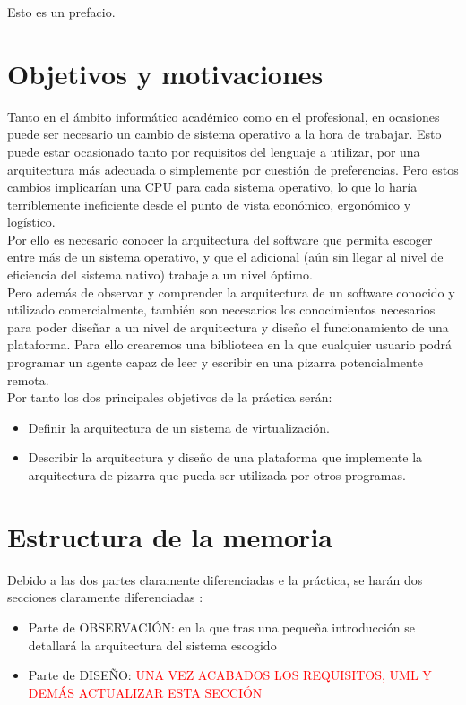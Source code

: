 \lettrine[lines=1,slope=4pt,findent=0pt]{E}{}sto es un prefacio.\\

\section*{Objetivos y motivaciones}
Tanto en el ámbito informático académico como en el profesional, en ocasiones puede ser necesario un cambio de sistema operativo a la hora de trabajar. Esto puede estar ocasionado tanto por requisitos del lenguaje a utilizar, por una arquitectura más adecuada o simplemente por cuestión de preferencias. Pero estos cambios implicarían una CPU para cada sistema operativo, lo que lo haría terriblemente ineficiente desde el punto de vista económico, ergonómico y logístico. \\
Por ello es necesario conocer la arquitectura del software que permita escoger entre más de un sistema operativo, y que el adicional (aún sin llegar al nivel de eficiencia del sistema nativo) trabaje a un nivel óptimo.\\
Pero además de observar y comprender la arquitectura de un software conocido y utilizado comercialmente, también son necesarios los conocimientos necesarios para poder diseñar a un nivel de arquitectura y diseño el funcionamiento de una plataforma. Para ello crearemos una biblioteca en la que cualquier usuario podrá programar un agente capaz de leer y escribir en una pizarra potencialmente remota.\\
Por tanto los dos principales objetivos de la práctica serán:
\begin{itemize}
\item Definir la arquitectura de un sistema de virtualización.
\item Describir la arquitectura y diseño de una plataforma que implemente la arquitectura de pizarra que pueda ser utilizada por otros programas.
\end{itemize}

\section*{Estructura de la memoria}
Debido a las dos partes claramente diferenciadas e la práctica, se harán dos secciones claramente diferenciadas :
\begin{itemize}
\item Parte de OBSERVACIÓN: en la que tras una pequeña introducción se detallará la arquitectura del sistema escogido
\item Parte de DISEÑO: \textcolor{red}{UNA VEZ ACABADOS LOS REQUISITOS, UML Y DEMÁS ACTUALIZAR ESTA SECCIÓN}
\end{itemize}

